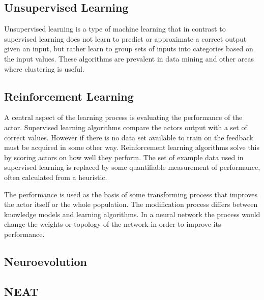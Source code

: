 \subsection{Unsupervised Learning}
Unsupervised learning is a type of machine learning that in contrast to supervised learning does not learn to predict or approximate a correct output given an input, but rather learn to group sets of inputs into categories based on the input values. These algorithms are prevalent in data mining and other areas where clustering is useful. 

\subsection{Reinforcement Learning}
A central aspect of the learning process is evaluating the performance of the actor. Supervised learning algorithms compare the actors output with a set of correct values. However if there is no data set available to train on the feedback must be acquired in some other way. Reinforcement learning algorithms solve this by scoring actors on how well they perform. The set of example data used in supervised learning is replaced by some quantifiable measurement of performance, often calculated from a heuristic. 

The performance is used as the basis of some transforming process that improves the actor itself or the whole population. The modification process differs between knowledge models and learning algorithms. In a neural network the process would change the weights or topology of the network in order to improve its performance.


\subsection{Neuroevolution}

\subsection{NEAT}
